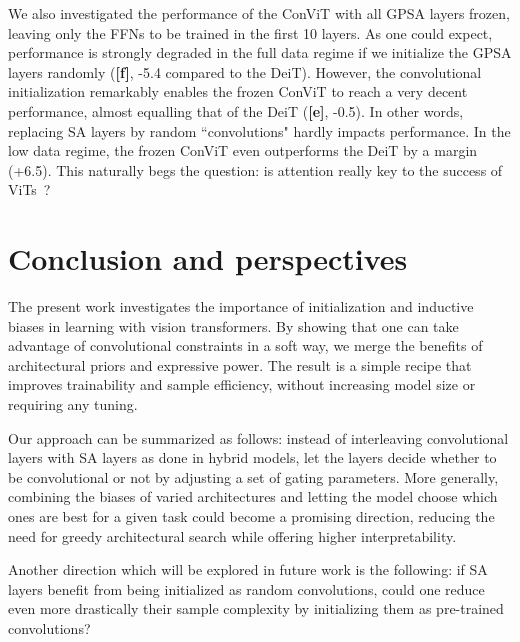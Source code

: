 We also investigated the performance of the ConViT with all GPSA layers frozen, leaving only the FFNs to be trained in the first 10 layers. As one could expect, performance is strongly degraded in the full data regime if we initialize the GPSA layers randomly (\textbf{[f]}, -5.4 compared to the DeiT). However, the convolutional initialization remarkably enables the frozen ConViT to reach a very decent performance, almost equalling that of the DeiT (\textbf{[e]}, -0.5). In other words, replacing SA layers by random ``convolutions" hardly impacts performance. In the low data regime, the frozen ConViT even outperforms the DeiT by a margin (+6.5). This naturally begs the question: is attention really key to the success of ViTs~\cite{dong2021attention,tolstikhin2021mlp,touvron2021resmlp}?

\section{Conclusion and perspectives}

The present work investigates the importance of initialization and inductive biases in learning with vision transformers. By showing that one can take advantage of convolutional constraints in a soft way, we merge the benefits of architectural priors and expressive power. The result is a simple recipe that improves trainability and sample efficiency, without increasing model size or requiring any tuning. 

Our approach can be summarized as follows: instead of interleaving convolutional layers with SA layers as done in hybrid models, let the layers decide whether to be convolutional or not by adjusting a set of gating parameters. More generally, combining the biases of varied architectures and letting the model choose which ones are best for a given task could become a promising direction, reducing the need for greedy architectural search while offering higher interpretability. 

Another direction which will be explored in future work is the following: if SA layers benefit from being initialized as random convolutions, could one reduce even more drastically their sample complexity by initializing them as pre-trained convolutions?








